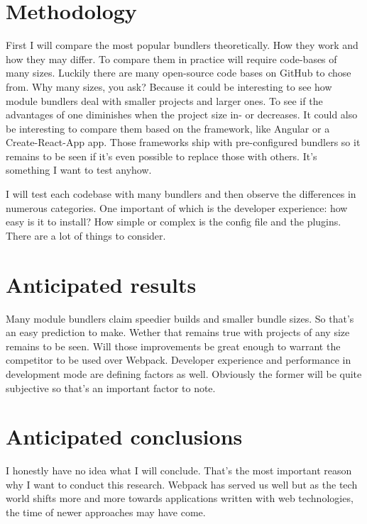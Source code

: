 \section{Methodology}
\label{sec:methodologie}

First I will compare the most popular bundlers theoretically. How they work and how they may differ. 
To compare them in practice will require code-bases of many sizes. Luckily there are many open-source code bases on GitHub to chose from. Why many sizes, you ask? Because it could be interesting to see how module bundlers deal with smaller projects and larger ones. To see if the advantages of one diminishes when the project size in- or decreases. It could also be interesting to compare them based on the framework, like Angular or a Create-React-App app. Those frameworks ship with pre-configured bundlers so it remains to be seen if it's even possible to replace those with others. It's something I want to test anyhow. 

I will test each codebase with many bundlers and then observe the differences in numerous categories. One important of which is the developer experience: how easy is it to install? How simple or complex is the config file and the plugins. There are a lot of things to consider. 

\section{Anticipated results}
\label{sec:verwachte_resultaten}

Many module bundlers claim speedier builds and smaller bundle sizes. So that's an easy prediction to make. Wether that remains true with projects of any size remains to be seen. Will those improvements be great enough to warrant the competitor to be used over Webpack. Developer experience and performance in development mode are defining factors as well. Obviously the former will be quite subjective so that's an important factor to note.

\section{Anticipated conclusions}
\label{sec:verwachte_conclusies}

I honestly have no idea what I will conclude. That's the most important reason why I want to conduct this research. Webpack has served us well but as the tech world shifts more and more towards applications written with web technologies, the time of newer approaches may have come.

